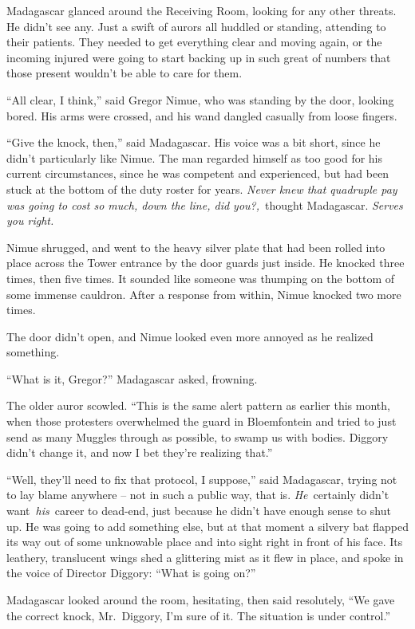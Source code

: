 Madagascar glanced around the Receiving Room, looking for any other
threats. He didn't see any. Just a swift of aurors all huddled or
standing, attending to their patients. They needed to get everything
clear and moving again, or the incoming injured were going to start
backing up in such great of numbers that those present wouldn't be able
to care for them.

``All clear, I think,'' said Gregor Nimue, who was standing by the door,
looking bored. His arms were crossed, and his wand dangled casually from
loose fingers.

``Give the knock, then,'' said Madagascar. His voice was a bit short,
since he didn't particularly like Nimue. The man regarded himself as too
good for his current circumstances, since he was competent and
experienced, but had been stuck at the bottom of the duty roster for
years. \emph{Never knew that quadruple pay was going to cost so much,
down the line, did you?,}~thought Madagascar. \emph{Serves you right.}

Nimue shrugged, and went to the heavy silver plate that had been rolled
into place across the Tower entrance by the door guards just inside. He
knocked three times, then five times. It sounded like someone was
thumping on the bottom of some immense cauldron. After a response from
within, Nimue knocked two more times.

The door didn't open, and Nimue looked even more annoyed as he realized
something.

``What is it, Gregor?'' Madagascar asked, frowning.

The older auror scowled. ``This is the same alert pattern as earlier
this month, when those protesters overwhelmed the guard in Bloemfontein
and tried to just send as many Muggles through as possible, to swamp us
with bodies. Diggory didn't change it, and now I bet they're realizing
that.''

``Well, they'll need to fix that protocol, I suppose,'' said Madagascar,
trying not to lay blame anywhere -- not in such a public way, that is.
\emph{He}~certainly didn't want~\emph{his}~career to dead-end, just
because he didn't have enough sense to shut up. He was going to add
something else, but at that moment a silvery bat flapped its way out of
some unknowable place and into sight right in front of his face. Its
leathery, translucent wings shed a glittering mist as it flew in place,
and spoke in the voice of Director Diggory: ``What is going on?''

Madagascar looked around the room, hesitating, then said resolutely,
``We gave the correct knock, Mr.~Diggory, I'm sure of it. The situation
is under control.''

